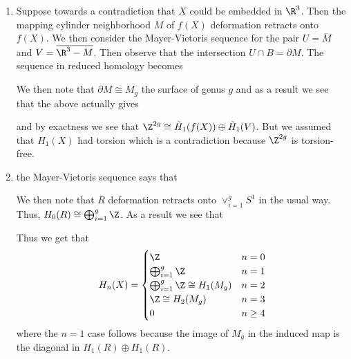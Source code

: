 \documentclass{article}
\begin{document}
\begin{solution}{\parindent}
  \begin{enumerate}
  \item Suppose towards a contradiction that $X$ could be embedded in
    $\R^3$. Then the mapping cylinder neighborhood $M$ of $f(X)$
    deformation retracts onto $f(X)$. We then consider the
    Mayer-Vietoris sequence for the pair $U = \overline{M}$ and $V =
    \overline{\R^3 - M}$. Then observe that the intersection $U \cap B
    = \partial M$. The sequence in reduced homology becomes
    \begin{center}
    \end{center}
    We then note that $\partial M \cong M_g$ the surface of genus $g$
    and as a result we see that the above actually gives
    \begin{center}
    \end{center}
    and by exactness we see that $\Z^{2g} \cong \tilde{H}_1(f(X))
    \oplus \tilde{H}_1(V)$. But we assumed that $H_1(X)$ had torsion
    which is a contradiction because $\Z^{2g}$ is torsion-free.
  \item the Mayer-Vietoris sequence says that
    \begin{center}
    \end{center}
    We then note that $R$ deformation retracts onto $\vee_{i=1}^g S^1$
    in the usual way. Thus, $H_0(R) \cong \bigoplus_{i=1}^g
    \Z$. As a result we see that
    \begin{center}
    \end{center}
    Thus we get that
    \[
    H_n(X) =
    \begin{cases}
      \Z & n=0 \\
      \bigoplus_{i=1}^g \Z & n=1 \\
      \bigoplus_{i=1}^g \Z \cong H_1(M_g) & n=2 \\
      \Z \cong H_2(M_g) & n = 3 \\
      0 & n \geq 4
    \end{cases}
    \]
    where the $n=1$ case follows because the image of $M_g$ in the
    induced map is the diagonal in $H_1(R) \oplus H_1(R)$.
  \end{enumerate}
\end{solution}
\end{document}
